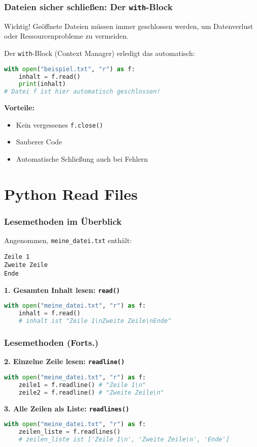 \documentclass[aspectratio=169]{beamer} %
\begin{document}
\begin{frame}[fragile]
\frametitle{Dateien sicher schließen: Der \texttt{with}-Block}
\begin{alertblock}{Wichtig!}
Geöffnete Dateien müssen immer geschlossen werden, um Datenverlust oder Ressourcenprobleme zu vermeiden.
\end{alertblock}
Der \texttt{with}-Block (Context Manager) erledigt das automatisch:
\begin{lstlisting}[language=Python]
with open("beispiel.txt", "r") as f:
    inhalt = f.read()
    print(inhalt)
# Datei f ist hier automatisch geschlossen!
\end{lstlisting}
\textbf{Vorteile:}
\begin{itemize}
    \item Kein vergessenes \texttt{f.close()}
    \item Sauberer Code
    \item Automatische Schließung auch bei Fehlern
\end{itemize}
\end{frame}

\section{Python Read Files}
\begin{frame}[fragile]
\frametitle{Lesemethoden im Überblick}
Angenommen, \texttt{meine\_datei.txt} enthält:
\begin{verbatim}
Zeile 1
Zweite Zeile
Ende
\end{verbatim}
\textbf{1. Gesamten Inhalt lesen: \texttt{read()}}
\begin{lstlisting}[language=Python]
with open("meine_datei.txt", "r") as f:
    inhalt = f.read()
    # inhalt ist "Zeile 1\nZweite Zeile\nEnde"
\end{lstlisting}
\end{frame}

\begin{frame}[fragile]
\frametitle{Lesemethoden (Forts.)}
\textbf{2. Einzelne Zeile lesen: \texttt{readline()}}
\begin{lstlisting}[language=Python]
with open("meine_datei.txt", "r") as f:
    zeile1 = f.readline() # "Zeile 1\n"
    zeile2 = f.readline() # "Zweite Zeile\n"
\end{lstlisting}
\textbf{3. Alle Zeilen als Liste: \texttt{readlines()}}
\begin{lstlisting}[language=Python]
with open("meine_datei.txt", "r") as f:
    zeilen_liste = f.readlines()
    # zeilen_liste ist ['Zeile 1\n', 'Zweite Zeile\n', 'Ende']
\end{lstlisting}
\end{frame}
\end{document}
